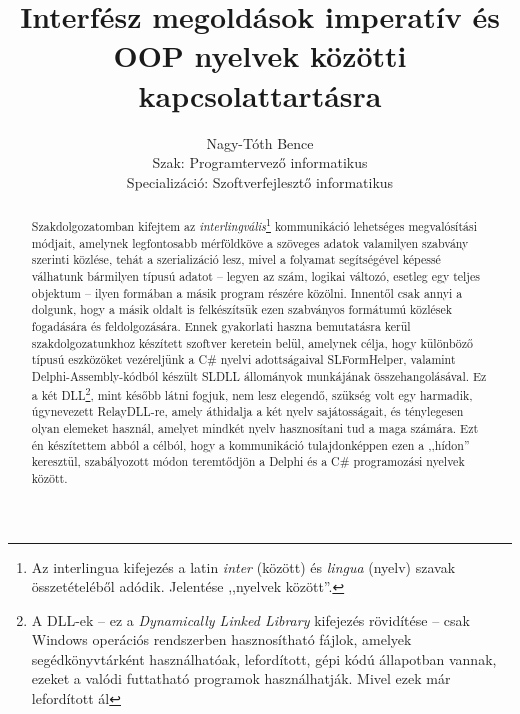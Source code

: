 \documentclass[tocnopagenum]{thesis-ekf}
\begin{document}
	\title{Interfész megoldások imperatív és OOP nyelvek közötti kapcsolattartásra}
	\author{Nagy-Tóth Bence\\Szak: Programtervező informatikus\\Specializáció: Szoftverfejlesztő informatikus}
	\date{\the\year{}}
	\VerbatimFootnotes
	\maketitle
	\tableofcontents
	\begin{abstract}
		Szakdolgozatomban kifejtem az \textit{interlingvális}\footnote{Az interlingua kifejezés a latin \textit{inter} (között) és \textit{lingua} (nyelv) szavak összetételéből adódik. Jelentése ,,nyelvek között''.} kommunikáció lehetséges megvalósítási módjait, amelynek legfontosabb mérföldköve a szöveges adatok valamilyen szabvány szerinti közlése, tehát a szerializáció lesz, mivel a folyamat segítségével képessé válhatunk bármilyen típusú adatot -- legyen az szám, logikai változó, esetleg egy teljes objektum -- ilyen formában a másik program részére közölni. Innentől csak annyi a dolgunk, hogy a másik oldalt is felkészítsük ezen szabványos formátumú közlések fogadására és feldolgozására. Ennek gyakorlati haszna bemutatásra kerül szakdolgozatunkhoz készített szoftver keretein belül, amelynek célja, hogy különböző típusú eszközöket vezéreljünk a C\# nyelvi adottságaival SLFormHelper, valamint Delphi-Assembly-kódból készült SLDLL állományok munkájának összehangolásával. Ez a két DLL\footnote{A DLL-ek -- ez a \textit{Dynamically Linked Library} kifejezés rövidítése -- csak Windows operációs rendszerben hasznosítható fájlok, amelyek segédkönyvtárként használhatóak, lefordított, gépi kódú állapotban vannak, ezeket a valódi futtatható programok használhatják. Mivel ezek már lefordított ál}, mint később látni fogjuk, nem lesz elegendő, szükség volt egy harmadik, úgynevezett RelayDLL-re, amely áthidalja a két nyelv sajátosságait, és ténylegesen olyan elemeket használ, amelyet mindkét nyelv hasznosítani tud a maga számára. Ezt én készítettem abból a célból, hogy a kommunikáció tulajdonképpen ezen a ,,hídon'' keresztül, szabályozott módon teremtődjön a Delphi és a C\# programozási nyelvek között.
		

\end{abstract}
\end{document}
